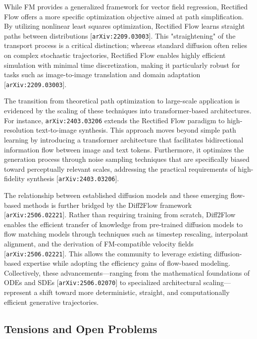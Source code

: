 \documentclass[11pt]{article}
\begin{document}
While FM provides a generalized framework for vector field regression, Rectified Flow offers a more specific optimization objective aimed at path simplification. By utilizing nonlinear least squares optimization, Rectified Flow learns straight paths between distributions [\texttt{arXiv:2209.03003}]. This "straightening" of the transport process is a critical distinction; whereas standard diffusion often relies on complex stochastic trajectories, Rectified Flow enables highly efficient simulation with minimal time discretization, making it particularly robust for tasks such as image-to-image translation and domain adaptation [\texttt{arXiv:2209.03003}].

The transition from theoretical path optimization to large-scale application is evidenced by the scaling of these techniques into transformer-based architectures. For instance, \texttt{arXiv:2403.03206} extends the Rectified Flow paradigm to high-resolution text-to-image synthesis. This approach moves beyond simple path learning by introducing a transformer architecture that facilitates bidirectional information flow between image and text tokens. Furthermore, it optimizes the generation process through noise sampling techniques that are specifically biased toward perceptually relevant scales, addressing the practical requirements of high-fidelity synthesis [\texttt{arXiv:2403.03206}].

The relationship between established diffusion models and these emerging flow-based methods is further bridged by the Diff2Flow framework [\texttt{arXiv:2506.02221}]. Rather than requiring training from scratch, Diff2Flow enables the efficient transfer of knowledge from pre-trained diffusion models to flow matching models through techniques such as timestep rescaling, interpolant alignment, and the derivation of FM-compatible velocity fields [\texttt{arXiv:2506.02221}]. This allows the community to leverage existing diffusion-based expertise while adopting the efficiency gains of flow-based modeling. Collectively, these advancements—ranging from the mathematical foundations of ODEs and SDEs [\texttt{arXiv:2506.02070}] to specialized architectural scaling—represent a shift toward more deterministic, straight, and computationally efficient generative trajectories.

\subsection{Tensions and Open Problems}
\end{document}
